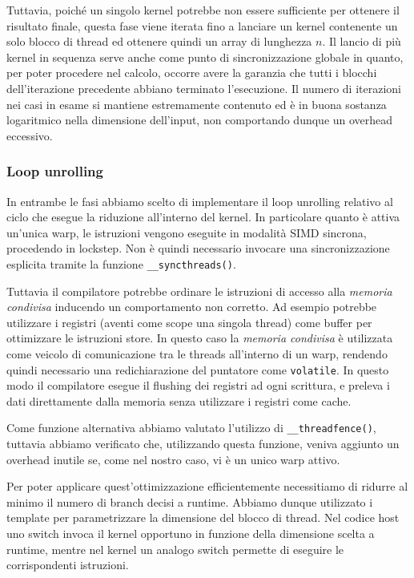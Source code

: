 \documentclass[a4paper]{article}   %
\begin{document}
Tuttavia, poiché un singolo kernel potrebbe non essere sufficiente per ottenere il risultato finale, questa fase viene iterata fino a lanciare un kernel contenente un solo blocco di thread ed ottenere quindi un array di lunghezza $n$. Il lancio di più kernel in sequenza serve anche come punto di sincronizzazione globale in quanto, per poter procedere nel calcolo, occorre avere la garanzia che tutti i blocchi dell’iterazione precedente abbiano terminato l’esecuzione. Il numero di iterazioni nei casi in esame si mantiene estremamente contenuto ed è in buona sostanza logaritmico nella dimensione dell’input, non comportando dunque un overhead eccessivo. 

\subsubsection{Loop unrolling}
In entrambe le fasi abbiamo scelto di implementare il loop unrolling relativo al ciclo che esegue la riduzione all’interno del kernel. In particolare quanto è attiva un’unica warp, le istruzioni vengono eseguite in modalità SIMD sincrona, procedendo in lockstep. Non è quindi necessario invocare una sincronizzazione esplicita tramite la funzione {\tt \_\_syncthreads()}.

Tuttavia il compilatore potrebbe ordinare le istruzioni di accesso alla \emph{memoria condivisa} inducendo un comportamento non corretto. Ad esempio potrebbe utilizzare i registri (aventi come scope una singola thread) come buffer per ottimizzare le istruzioni store.
In questo caso la \emph{memoria condivisa} è utilizzata come veicolo di comunicazione tra le threads all’interno di un warp, rendendo quindi necessario una redichiarazione del puntatore come {\tt volatile}. In questo modo il compilatore esegue il flushing dei registri ad ogni scrittura, e preleva i dati direttamente dalla memoria senza utilizzare i registri come cache.

Come funzione alternativa abbiamo valutato l’utilizzo di {\tt \_\_threadfence()}, tuttavia abbiamo verificato che, utilizzando questa funzione, veniva aggiunto un overhead inutile se, come nel nostro caso, vi è un unico warp attivo.

Per poter applicare quest’ottimizzazione efficientemente necessitiamo di ridurre al minimo il numero di branch decisi a runtime. Abbiamo dunque utilizzato i template per parametrizzare la dimensione del blocco di thread. Nel codice host uno switch invoca il kernel opportuno in funzione della dimensione scelta a runtime, mentre nel kernel un analogo switch permette di eseguire le corrispondenti istruzioni.
\end{document}
